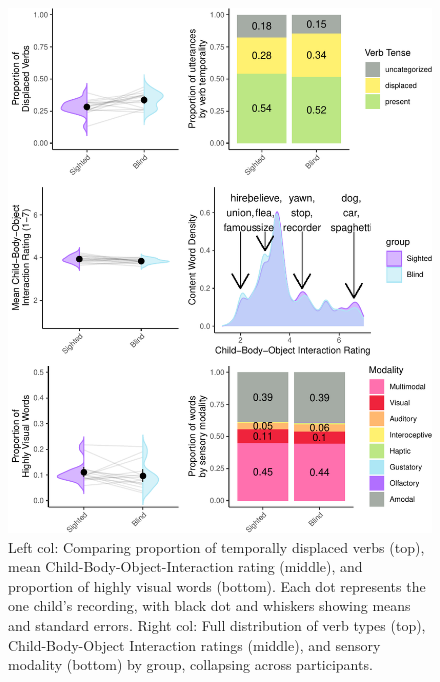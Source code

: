 \documentclass[
  man]{apa6}
\begin{document}
\begin{figure}
\centering
\includegraphics{input_quality_manuscript_files/figure-latex/conceptual-plots-1.pdf}
\caption{\label{fig:conceptual-plots}Left col: Comparing proportion of temporally displaced verbs (top), mean Child-Body-Object-Interaction rating (middle), and proportion of highly visual words (bottom). Each dot represents the one child's recording, with black dot and whiskers showing means and standard errors. Right col: Full distribution of verb types (top), Child-Body-Object Interaction ratings (middle), and sensory modality (bottom) by group, collapsing across participants.}
\end{figure}
\end{document}
